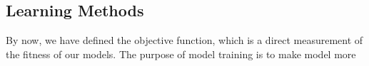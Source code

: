 \subsection {Learning Methods}
By now, we have defined the objective function, which is a direct measurement of the fitness of our models. The purpose of model training is to make model more 